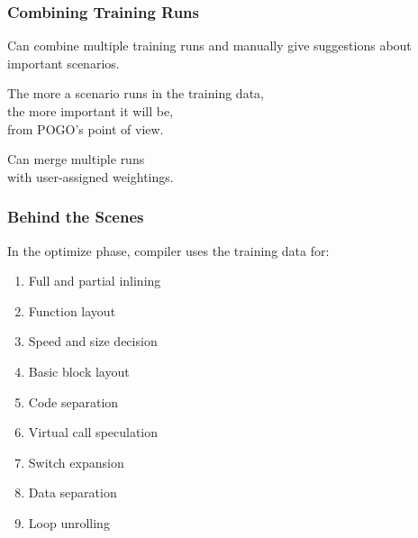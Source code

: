 \begin{frame}
\frametitle{Combining Training Runs}


\begin{changemargin}{2cm}
Can combine multiple training runs and manually give suggestions about important scenarios.

The more a scenario runs in the training data, \\
the more important it will be, \\
from POGO's point of view.

Can merge multiple runs \\
with user-assigned weightings.
\end{changemargin}

\end{frame}


\begin{frame}
\frametitle{Behind the Scenes}


\begin{changemargin}{2cm}
In the optimize phase, compiler uses the training data for:

\begin{enumerate}
\item Full and partial inlining
\item Function layout
\item Speed and size decision
\item Basic block layout 
\item Code separation
\item Virtual call speculation
\item Switch expansion
\item Data separation
\item Loop unrolling
\end{enumerate}
\end{changemargin}
\end{frame}



